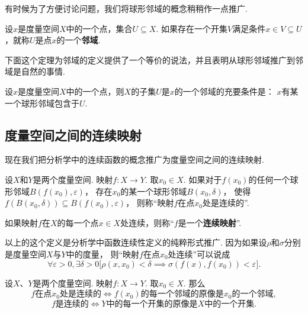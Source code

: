 有时候为了方便讨论问题，我们将球形邻域的概念稍稍作一点推广.
\begin{definition}\label{definition:测度论.邻域的概念}
设\(x\)是度量空间\(X\)中的一个点，集合\(U \subseteq X\).
如果存在一个开集\(V\)满足条件\(x \in V \subseteq U\)，就称\(U\)是点\(x\)的一个\textbf{邻域}.
\end{definition}
下面这个定理为邻域的定义提供了一个等价的说法，并且表明从球形邻域推广到邻域是自然的事情.
\begin{theorem}
设\(x\)是度量空间\(X\)中的一个点，则\(X\)的子集\(U\)是\(x\)的一个邻域的充要条件是：
\(x\)有某一个球形邻域包含于\(U\).
\end{theorem}

\subsection{度量空间之间的连续映射}
现在我们把分析学中的连续函数的概念推广为度量空间之间的连续映射.

\begin{definition}\label{definition:测度论.连续映射的概念}
设\(X\)和\(Y\)是两个度量空间.
映射\(f\colon X \to Y\).
取\(x_0 \in X\).
如果对于\(f(x_0)\)的任何一个球形邻域\(B(f(x_0),\varepsilon)\)，%
存在\(x_0\)的某一个球形邻域\(B(x_0,\delta)\)，%
使得\(f(B(x_0,\delta)) \subseteq B(f(x_0),\varepsilon)\)，%
则称“映射\(f\)在点\(x_0\)处是连续的”.

如果映射\(f\)在\(X\)的每一个点\(x \in X\)处连续，则称“\(f\)是一个\textbf{连续映射}”.
\end{definition}
以上的这个定义是分析学中函数连续性定义的纯粹形式推广.
因为如果设\(\rho\)和\(\sigma\)分别是度量空间\(X\)与\(Y\)中的度量，%
则“映射\(f\)在点\(x_0\)处连续”可以说成\[
\forall\varepsilon>0,
\exists\delta>0
\bigl[
\rho(x,x_0)<\delta
\implies
\sigma(f(x),f(x_0))<\varepsilon
\bigr].
\]

\begin{theorem}\label{theorem:测度论.度量空间下的连续映射与邻域的联系}
设\(X\)、\(Y\)是两个度量空间.
映射\(f\colon X \to Y\).
取\(x_0 \in X\).
那么\[
\text{\(f\)在点\(x_0\)处是连续的}
\iff
\text{\(f(x_0)\)的每一个邻域的原像是\(x_0\)的一个邻域},
\]\[
\text{\(f\)是连续的}
\iff
\text{\(Y\)中的每一个开集的原像是\(X\)中的一个开集}.
\]
\end{theorem}


\begingroup
\def\T{\mathfrak T}%
\def\oT{\overline{\mathfrak T}}%

